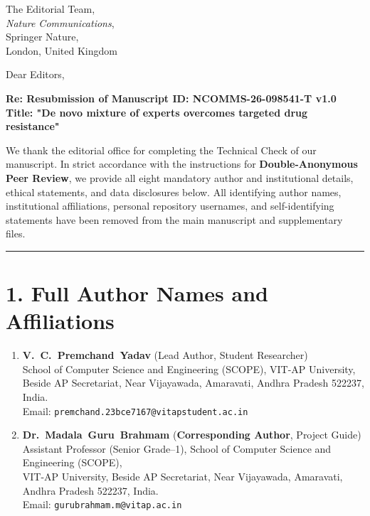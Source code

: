 \documentclass[11pt]{letter}
\begin{document}
\begin{letter}{%
    The Editorial Team,\\
    \textit{Nature Communications},\\
    Springer Nature,\\
    London, United Kingdom
}

\opening{Dear Editors,}

\textbf{Re: Resubmission of Manuscript ID: NCOMMS-26-098541-T v1.0}\\
\textbf{Title: "De novo mixture of experts overcomes targeted drug resistance"}

We thank the editorial office for completing the Technical Check of our manuscript. In strict accordance with the instructions for \textbf{Double-Anonymous Peer Review}, we provide all eight mandatory author and institutional details, ethical statements, and data disclosures below. All identifying author names, institutional affiliations, personal repository usernames, and self-identifying statements have been removed from the main manuscript and supplementary files.

\vspace{0.5em}
\hrule
\vspace{0.8em}

\section*{1. Full Author Names and Affiliations}
\begin{enumerate}\setlength{\itemsep}{0.5em}
    \item \textbf{V.~C.~Premchand~Yadav} (Lead Author, Student Researcher)\\
    School of Computer Science and Engineering (SCOPE), VIT-AP University,\\
    Beside AP Secretariat, Near Vijayawada, Amaravati, Andhra Pradesh 522237, India.\\
    Email: \texttt{premchand.23bce7167@vitapstudent.ac.in}

    \item \textbf{Dr.~Madala~Guru~Brahmam} (\textbf{Corresponding Author}, Project Guide)\\
    Assistant Professor (Senior Grade--1), School of Computer Science and Engineering (SCOPE),\\
    VIT-AP University, Beside AP Secretariat, Near Vijayawada, Amaravati, Andhra Pradesh 522237, India.\\
    Email: \texttt{gurubrahmam.m@vitap.ac.in}


\end{enumerate}
\end{letter}
\end{document}
